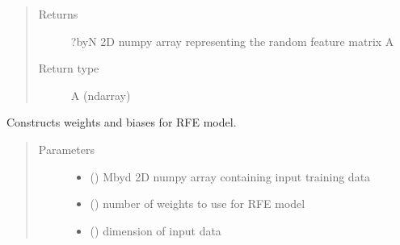 \documentclass[letterpaper,10pt,english]{sphinxmanual}
\begin{document}
\begin{fulllineitems}
\begin{fulllineitems}
\begin{quote}
\begin{description}
\item[{Returns}] \leavevmode
\sphinxAtStartPar
?\sphinxhyphen{}by\sphinxhyphen{}N 2D numpy array representing the random feature matrix A

\item[{Return type}] \leavevmode
\sphinxAtStartPar
A (ndarray)

\end{description}\end{quote}

\end{fulllineitems}


\begin{fulllineitems}
\label{\detokenize{rom:rom.response_surfaces.RFE.construct_weights}}
\sphinxAtStartPar
Constructs weights and biases for RFE model.
\begin{quote}\begin{description}
\item[{Parameters}] \leavevmode\begin{itemize}
\item {} 
\sphinxAtStartPar
{} () \textendash{} M\sphinxhyphen{}by\sphinxhyphen{}d 2D numpy array containing input training data

\item {} 
\sphinxAtStartPar
{} () \textendash{} number of weights to use for RFE model

\item {} 
\sphinxAtStartPar
{} () \textendash{} dimension of input data

\end{itemize}

\end{description}\end{quote}

\end{fulllineitems}



\end{fulllineitems}
\end{document}
